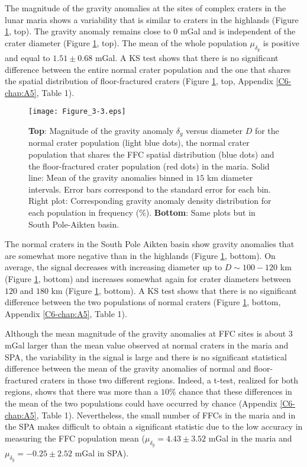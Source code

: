 The magnitude of the gravity anomalies at the sites of complex craters
in the lunar  maria shows a variability that is  similar to craters in
the  highlands (Figure  \ref{C6-Figure3-3},  top).   The gravity  anomaly
remains close  to $0$ mGal and  is independent of the  crater diameter
(Figure  \ref{C6-Figure3-3},  top).  The  mean  of  the whole  population
$\mu_{\delta_g}$ is positive and equal to  $1.51 \pm 0.68$ mGal.  A KS
test shows that there is  no significant difference between the entire
normal  crater  population  and  the   one  that  shares  the  spatial
distribution of floor-fractured  craters (Figure \ref{C6-Figure3-3}, top,
Appendix \ref{C6-chap:A5}, Table 1).
\begin{figure}[h!]
  \graphicspath{ {/Users/thorey/Documents/These/Projet/FFC/Gravi_GRAIL/Article/Papier/Proof/} }
  \begin{center}
    \texttt{[image: Figure\_3-3.eps]}
    \caption{\textbf{Top}: Magnitude of the gravity anomaly $\delta_g$
      versus diameter $D$ for the normal crater population (light blue
      dots), the normal crater population  that shares the FFC spatial
      distribution (blue dots)  and the  floor-fractured crater
      population (red dots) in the maria. Solid line: Mean of the
      gravity anomalies  binned in $15$ km  diameter intervals.  Error
      bars correspond to the standard error for each bin.  Right plot:
      Corresponding  gravity  anomaly  density distribution  for  each
      population in frequency ($\%$).  \textbf{Bottom}: Same plots but
      in South Pole-Aikten basin.}
    \label{C6-Figure3-3}
  \end{center}
\end{figure}

The  normal  craters in  the  South  Pole  Aikten basin  show  gravity
anomalies  that  are somewhat  more  negative  than in  the  highlands
(Figure \ref{C6-Figure3-3},  bottom).  On  average, the  signal decreases
with  increasing   diameter  up  to   $D  \sim  100-120$   km  (Figure
\ref{C6-Figure3-3},  bottom)  and  increases somewhat  again  for  crater
diameters between $120$ and $180$ km (Figure \ref{C6-Figure3-3}, bottom).
A KS  test shows that there  is no significant difference  between the
two  populations of  normal craters  (Figure \ref{C6-Figure3-3},  bottom,
Appendix \ref{C6-chap:A5}, Table 1).

Although the mean  magnitude of the gravity anomalies at  FFC sites is
about $3$ mGal  larger than the mean value observed  at normal craters
in the maria and SPA, the variability in the signal is large and there
is  no significant  statistical  difference between  the  mean of  the
gravity anomalies of  normal and floor-fractured craters  in those two
different regions.  Indeed, a t-test, realized for both regions, shows
that there was more than a $10\%$ chance that these differences in the
mean of  the two populations  could have occurred by  chance (Appendix
\ref{C6-chap:A5}, Table  1).  Nevertheless, the  small number of  FFCs in
the  maria and  in the  SPA makes  difficult to  obtain a  significant
statistic due to the low accuracy in measuring the FFC population mean
($\mu_{\delta_g}   =4.43  \pm   3.52   $  mGal   in   the  maria   and
$\mu_{\delta_g} =-0.25\pm 2.52 $ mGal in SPA).

